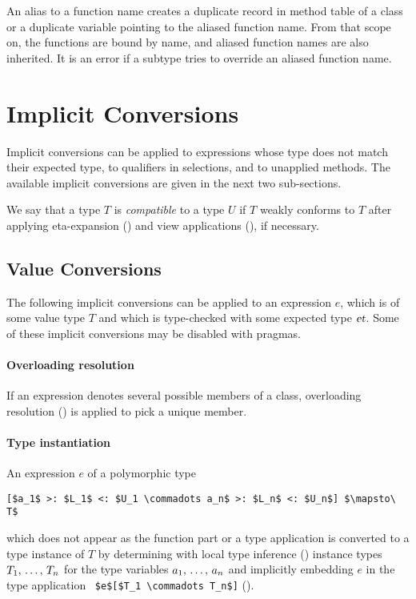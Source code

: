 An alias to a function name creates a duplicate record in method table of a class or a duplicate variable pointing to the aliased function name. From that scope on, the functions are bound by name, and aliased function names are also inherited. It is an error if a subtype tries to override an aliased function name. 






\section{Implicit Conversions}
\label{sec:implicit-conversions}

Implicit conversions can be applied to expressions whose type does not match their expected type, to qualifiers in selections, and to unapplied methods. The available implicit conversions are given in the next two sub-sections.

We say that a type $T$ is {\em compatible} to a type $U$ if $T$ weakly conforms to $T$ after applying eta-expansion () and view applications (), if necessary.






\subsection{Value Conversions}
\label{sec:value-conversions}

The following implicit conversions can be applied to an expression $e$, which is of some value type $T$ and which is type-checked with some expected type $\mbox{\sl et}$. Some of these implicit conversions may be disabled with pragmas.

\paragraph{Overloading resolution}
If an expression denotes several possible members of a class, overloading resolution () is applied to pick a unique member. 

\paragraph{Type instantiation}
An expression $e$ of a polymorphic type
\begin{lstlisting}
[$a_1$ >: $L_1$ <: $U_1 \commadots a_n$ >: $L_n$ <: $U_n$] $\mapsto\ T$
\end{lstlisting}
which does not appear as the function part or a type application is converted to a type instance of $T$ by determining with local type inference () instance types $T_1 ,\, \ldots ,\, T_n$ for the type variables $a_1 ,\, \ldots ,\, a_n$ and implicitly embedding $e$ in the type application ~\lstinline!$e$[$T_1 \commadots T_n$]! (). 

